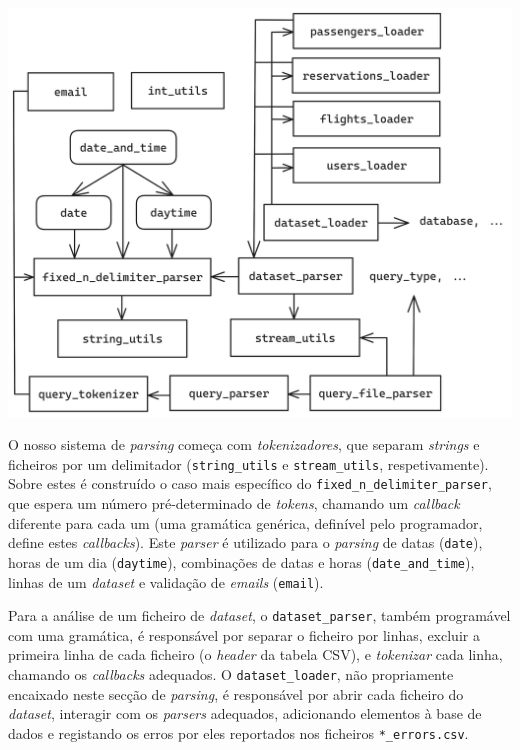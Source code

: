 \documentclass[12pt, a4paper]{article}
\begin{document}
\begin{center}
    \includegraphics[scale=0.17]{res/parsing.png}
\end{center}

O nosso sistema de \emph{parsing} começa com \emph{tokenizadores}, que separam \emph{strings} e
ficheiros por um delimitador (\texttt{string\_utils} e \texttt{stream\_utils}, respetivamente).
Sobre estes é construído o caso mais específico do \texttt{fixed\_n\_delimiter\_parser}, que espera
um número pré-determinado de \emph{tokens}, chamando um \emph{callback} diferente para cada um (uma
gramática genérica, definível pelo programador, define estes \emph{callbacks}). Este \emph{parser}
é utilizado para o \emph{parsing} de datas (\texttt{date}), horas de um dia (\texttt{daytime}),
combinações de datas e horas (\texttt{date\_and\_time}), linhas de um \emph{dataset} e validação de
\emph{emails} (\texttt{email}).

Para a análise de um ficheiro de \emph{dataset}, o \texttt{dataset\_parser}, também programável com
uma gramática, é responsável por separar o ficheiro por linhas, excluir a primeira linha de cada
ficheiro (o \emph{header} da tabela CSV), e \emph{tokenizar} cada linha, chamando os
\emph{callbacks} adequados. O \texttt{dataset\_loader}, não propriamente encaixado neste secção de
\emph{parsing}, é responsável por abrir cada ficheiro do \emph{dataset}, interagir com os
\emph{parsers} adequados, adicionando elementos à base de dados e registando os erros por eles
reportados nos ficheiros \texttt{*\_errors.csv}.
\end{document}
